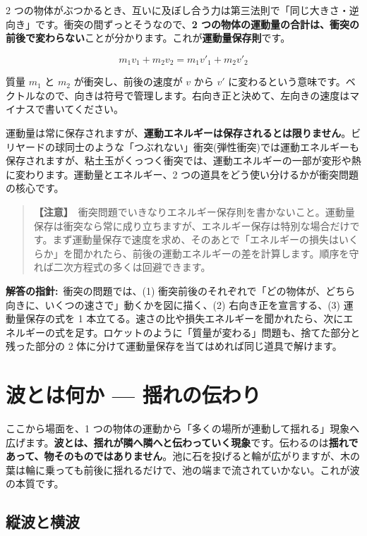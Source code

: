 \documentclass{article}
\begin{document}
2 つの物体がぶつかるとき、互いに及ぼし合う力は第三法則で「同じ大きさ・逆向き」です。衝突の間ずっとそうなので、\textbf{2 つの物体の運動量の合計は、衝突の前後で変わらない}ことが分かります。これが\textbf{運動量保存則}です。

\[ m_{1} v_{1} + m_{2} v_{2} = m_{1} v'_{1} + m_{2} v'_{2} \]

質量 \( m_{1} \) と \( m_{2} \) が衝突し、前後の速度が \( v \) から \( v' \) に変わるという意味です。ベクトルなので、向きは符号で管理します。右向き正と決めて、左向きの速度はマイナスで書いてください。

運動量は常に保存されますが、\textbf{運動エネルギーは保存されるとは限りません}。ビリヤードの球同士のような「つぶれない」衝突(弾性衝突)では運動エネルギーも保存されますが、粘土玉がくっつく衝突では、運動エネルギーの一部が変形や熱に変わります。運動量とエネルギー、2 つの道具をどう使い分けるかが衝突問題の核心です。

\begin{quote}
\textbf{【注意】}\ 衝突問題でいきなりエネルギー保存則を書かないこと。運動量保存は衝突なら常に成り立ちますが、エネルギー保存は特別な場合だけです。まず運動量保存で速度を求め、そのあとで「エネルギーの損失はいくらか」を聞かれたら、前後の運動エネルギーの差を計算します。順序を守れば二次方程式の多くは回避できます。
\end{quote}

\textbf{解答の指針:}\ 衝突の問題では、(1) 衝突前後のそれぞれで「どの物体が、どちら向きに、いくつの速さで」動くかを図に描く、(2) 右向き正を宣言する、(3) 運動量保存の式を 1 本立てる。速さの比や損失エネルギーを聞かれたら、次にエネルギーの式を足す。ロケットのように「質量が変わる」問題も、捨てた部分と残った部分の 2 体に分けて運動量保存を当てはめれば同じ道具で解けます。

\section{波とは何か — 揺れの伝わり}

ここから場面を、1 つの物体の運動から「多くの場所が連動して揺れる」現象へ広げます。\textbf{波とは、揺れが隣へ隣へと伝わっていく現象}です。伝わるのは\textbf{揺れであって、物そのものではありません}。池に石を投げると輪が広がりますが、木の葉は輪に乗っても前後に揺れるだけで、池の端まで流されていかない。これが波の本質です。

\subsection{縦波と横波}
\end{document}
